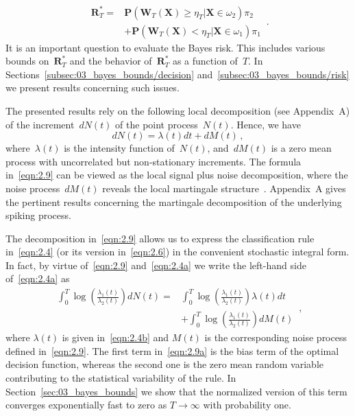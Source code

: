 \documentclass[lettersize,journal,onecolumn]{IEEEtran}
\theoremstyle{definition}
\begin{document}
\begin{equation}
	\begin{split}
		\mathbf{R}_{T}^{*} = {}
		&\mathbf{P}\left(\mathbf{W}_{T}(\mathbf{X})\geq\eta_{T}|
		\mathbf{X}\in\omega_{2}\right)\pi_{2}\\
		&+ \mathbf{P}\left(\mathbf{W}_{T}(\mathbf{X})<\eta_{T}|
		\mathbf{X}\in\omega_{1}\right)\pi_{1}
	\end{split}
	\label{eqn:2.8} \,.
\end{equation}
It is an important question to evaluate the Bayes risk. This includes various bounds 
on~$\mathbf{R}_{T}^{*}$ and the behavior of~$\mathbf{R}_{T}^{*}$ as a function of~$T$. 
In Sections~\ref{subsec:03_bayes_bounds/decision} and~\ref{subsec:03_bayes_bounds/risk} 
we present results concerning such issues.

The presented results rely on the following local decomposition 
(see Appendix~A) of the increment~$dN(t)$ of the point process~$N(t)$. Hence, we have
\begin{equation}
	dN(t) = \lambda(t)dt + dM(t)
	\label{eqn:2.9} \,,
\end{equation}
where~$\lambda(t)$ is the intensity function of~$N(t)$, and~$dM(t)$ is a zero mean 
process with uncorrelated but non-stationary increments. The formula 
in~\eqref{eqn:2.9} can be viewed as the local signal plus noise decomposition, where 
the noise process~$dM(t)$ reveals the local martingale 
structure~\cite{andersen2012statistical}. Appendix~A gives the pertinent results
concerning the martingale decomposition of the underlying spiking process.

The decomposition in~\eqref{eqn:2.9} allows us to express the classification rule 
in~\eqref{eqn:2.4} (or its version in~\eqref{eqn:2.6}) in the convenient stochastic 
integral form. In fact, by virtue of~\eqref{eqn:2.9} and~\eqref{eqn:2.4a} we write the 
left-hand side of~\eqref{eqn:2.4a} as
\begin{equation}
	\begin{split}
		\int_{0}^{T} \log \left(\frac{\lambda_{1}(t)}{\lambda_{2}(t)}\right)dN(t) = {}
		& \int_{0}^{T} \log \left(\frac{\lambda_{1}(t)}{\lambda_{2}(t)}\right)\lambda(t)dt \\
		& + \int_{0}^{T} \log \left(\frac{\lambda_{1}(t)}{\lambda_{2}(t)}\right)dM(t)
	\end{split}
	\label{eqn:2.9a} \,,
\end{equation}
where $\lambda(t)$ is given in~\eqref{eqn:2.4b} and $M(t)$ is the corresponding noise
process defined in~\eqref{eqn:2.9}.
The first term in~\eqref{eqn:2.9a} is the bias term of the optimal decision function, 
whereas the second one is the zero mean random variable contributing to the 
statistical variability of the rule. In Section~\ref{sec:03_bayes_bounds} we show that 
the normalized version of this term converges exponentially fast to zero as 
$T \to \infty$ with probability one.
\end{document}
